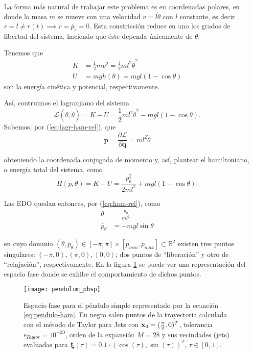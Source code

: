 

La forma más natural de trabajar este problema es en coordenadas polares, en donde la masa $m$ se mueve con una velocidad $v = l\dot{\theta}$ con $l$ constante, es decir $r = l \neq r(t) \implies \dot{r} = \dot{p_r} = 0$. Esta constricción reduce en uno los grados de libertad del sistema, haciendo que éste dependa únicamente de $\theta$. 

Tenemos que 
\begin{align}
 K &= \frac{1}{2}m v^2 = \frac{1}{2} m l^2 \dot{\theta}^2 \nonumber \\
 U &= mgh(\theta) = mgl\left(1 - \cos{\theta} \right)
\end{align}
son la energía cinética y potencial, respectivamente. 

Así, contruimos el lagranjiano del sistema
\begin{equation*}
 \mathcal{L}(\theta,\dot{\theta}) = K - U = \frac{1}{2} m l^2 \dot{\theta}^2 - mgl\left(1 - \cos{\theta} \right).
\end{equation*}
Sabemos, por (\ref{eq:lagr-ham-rel}), que
\begin{equation*}
 \mathbf{p} = \frac{\partial \mathcal{L}}{\partial \mathbf{\dot{q}}} = ml^2\dot{\theta}
\end{equation*}

obteniendo la coordenada conjugada de momento y, así, plantear el hamiltoniano, o energía total del sistema, como
\begin{equation}
 H(p,\theta) = K + U = \frac{p_{\theta}^2}{2ml^2} + mgl\left(1 - \cos{\theta} \right).
\label{eq:pendulo-ham}
\end{equation}
 
Las EDO quedan entonces, por (\ref{eq:ham-rel}), como
\begin{align}
 \dot{\theta} &= \frac{p_{\theta}}{ml^2} \nonumber \\
 \dot{p_{\theta}} &= -mgl\sin{\theta} 
\label{eq:pendulo-ode}
\end{align}

en cuyo dominio $(\theta,p_{\theta}) \in [-\pi,\pi]\times[p_{min},p_{max}] \subset \mathbb{R}^2$ existen tres puntos singulares: $(-\pi,0),(\pi,0), (0,0)$; dos puntos de ``liberación'' y otro de ``relajación'', respectivamente. En la figura \ref{fig:pendulum_pshp} se puede ver una representación del espacio fase donde se exhibe el comportamiento de dichos puntos.

\begin{figure}[h!]
 \centering
 \texttt{[image: pendulum\_phsp]}
 \caption{Espacio fase para el péndulo simple representado por la ecuación \ref{eq:pendulo-ham}. En negro salen puntos de la trayectoria calculada con el método de Taylor para Jets con $\mathbf{x}_0 = (\frac{\pi}{2},0)^T$, tolerancia $\epsilon_{Taylor} = 10^{-20}$, orden de la expansión $M = 28$ y sus vecindades (jets) evaluadas para $\mathbf{\xi}(\tau) = 0.1\cdot \left( \cos(\tau), \sin(\tau) \right)^T$, $\tau \in [0,1]$.}
\label{fig:pendulum_pshp}
\end{figure}

